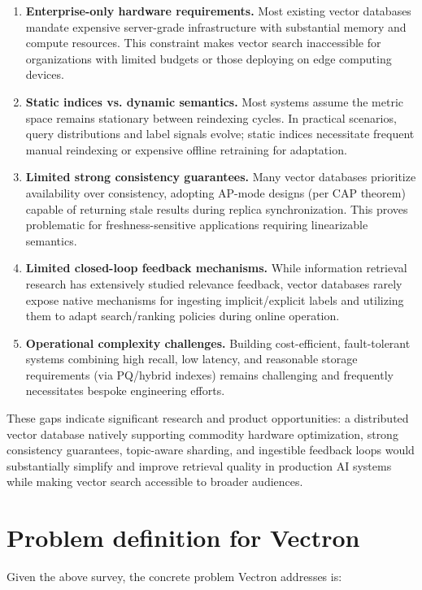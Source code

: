 \begin{enumerate}
    \item \textbf{Enterprise-only hardware requirements.} Most existing vector databases mandate expensive server-grade infrastructure with substantial memory and compute resources. This constraint makes vector search inaccessible for organizations with limited budgets or those deploying on edge computing devices.
    
    \item \textbf{Static indices vs. dynamic semantics.} Most systems assume the metric space remains stationary between reindexing cycles. In practical scenarios, query distributions and label signals evolve; static indices necessitate frequent manual reindexing or expensive offline retraining for adaptation.
    
    \item \textbf{Limited strong consistency guarantees.} Many vector databases prioritize availability over consistency, adopting AP-mode designs (per CAP theorem) capable of returning stale results during replica synchronization. This proves problematic for freshness-sensitive applications requiring linearizable semantics.
    
    \item \textbf{Limited closed-loop feedback mechanisms.} While information retrieval research has extensively studied relevance feedback, vector databases rarely expose native mechanisms for ingesting implicit/explicit labels and utilizing them to adapt search/ranking policies during online operation.
    
    \item \textbf{Operational complexity challenges.} Building cost-efficient, fault-tolerant systems combining high recall, low latency, and reasonable storage requirements (via PQ/hybrid indexes) remains challenging and frequently necessitates bespoke engineering efforts.
\end{enumerate}

These gaps indicate significant research and product opportunities: a distributed vector database natively supporting commodity hardware optimization, strong consistency guarantees, topic-aware sharding, and ingestible feedback loops would substantially simplify and improve retrieval quality in production AI systems while making vector search accessible to broader audiences.

\section{Problem definition for Vectron}
Given the above survey, the concrete problem Vectron addresses is:

